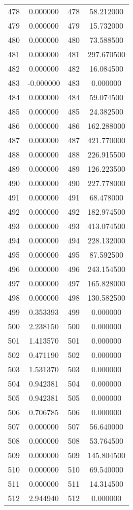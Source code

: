\documentclass[12pt]{article}
\begin{document}
\begin{longtable}{@{}cccc@{}}
478 & 0.000000 & 478 & 58.212000 \\
479 & 0.000000 & 479 & 15.732000 \\
480 & 0.000000 & 480 & 73.588500 \\
481 & 0.000000 & 481 & 297.670500 \\
482 & 0.000000 & 482 & 16.084500 \\
483 & -0.000000 & 483 & 0.000000 \\
484 & 0.000000 & 484 & 59.074500 \\
485 & 0.000000 & 485 & 24.382500 \\
486 & 0.000000 & 486 & 162.288000 \\
487 & 0.000000 & 487 & 421.770000 \\
488 & 0.000000 & 488 & 226.915500 \\
489 & 0.000000 & 489 & 126.223500 \\
490 & 0.000000 & 490 & 227.778000 \\
491 & 0.000000 & 491 & 68.478000 \\
492 & 0.000000 & 492 & 182.974500 \\
493 & 0.000000 & 493 & 413.074500 \\
494 & 0.000000 & 494 & 228.132000 \\
495 & 0.000000 & 495 & 87.592500 \\
496 & 0.000000 & 496 & 243.154500 \\
497 & 0.000000 & 497 & 165.828000 \\
498 & 0.000000 & 498 & 130.582500 \\
499 & 0.353393 & 499 & 0.000000 \\
500 & 2.238150 & 500 & 0.000000 \\
501 & 1.413570 & 501 & 0.000000 \\
502 & 0.471190 & 502 & 0.000000 \\
503 & 1.531370 & 503 & 0.000000 \\
504 & 0.942381 & 504 & 0.000000 \\
505 & 0.942381 & 505 & 0.000000 \\
506 & 0.706785 & 506 & 0.000000 \\
507 & 0.000000 & 507 & 56.640000 \\
508 & 0.000000 & 508 & 53.764500 \\
509 & 0.000000 & 509 & 145.804500 \\
510 & 0.000000 & 510 & 69.540000 \\
511 & 0.000000 & 511 & 14.314500 \\
512 & 2.944940 & 512 & 0.000000 \\

\end{longtable}
\end{document}
